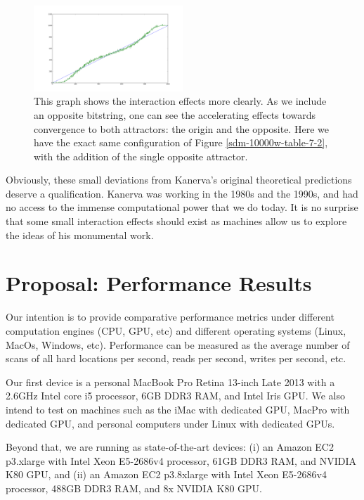 \begin{figure}[h]
\centering\includegraphics[width=0.5\textwidth]{images02/sdm-10000w-notX-table-7-2.png}
\caption{This graph shows the interaction effects more clearly.  As we include an opposite bitstring, one can see the accelerating effects towards convergence to both attractors: the origin and the opposite. Here we have the exact same configuration of Figure \ref{sdm-10000w-table-7-2}, with the addition of the single opposite attractor. 
\label{sdm-10000w-notX-table-7-2}}
\end{figure}

Obviously, these small deviations from Kanerva's original theoretical predictions deserve a qualification.  Kanerva was working in the 1980s and the 1990s, and had no access to the immense computational power that we do today. It is no surprise that some small interaction effects should exist as machines allow us to explore the ideas of his monumental work.

\section{Proposal: Performance Results}

Our intention is to provide comparative performance metrics under different computation engines (CPU, GPU, etc) and different operating systems (Linux, MacOs, Windows, etc). Performance can be measured as the average number of scans of all hard locations per second, reads per second, writes per second, etc.

Our first device is a personal MacBook Pro Retina 13-inch Late 2013 with a 2.6GHz Intel core i5 processor, 6GB DDR3 RAM, and Intel Iris GPU.  We also intend to test on machines such as the iMac with dedicated GPU, MacPro with dedicated GPU, and personal computers under Linux with dedicated GPUs.

Beyond that, we are running as state-of-the-art devices: (i) an Amazon EC2 p3.xlarge with Intel Xeon E5-2686v4 processor, 61GB DDR3 RAM, and NVIDIA K80 GPU, and (ii) an Amazon EC2 p3.8xlarge with Intel Xeon E5-2686v4 processor, 488GB DDR3 RAM, and 8x NVIDIA K80 GPU.


